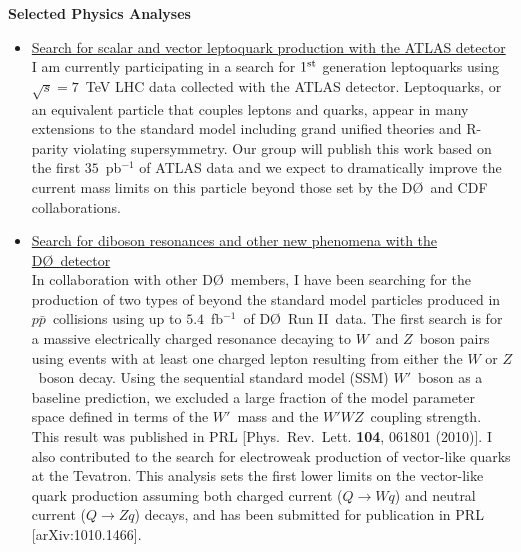 \documentclass[12pt]{article}
\newcommand{\dzero}{D\O}
\begin{document}
\noindent
\begin{singlespace}

\noindent
{\Large \textbf{Selected Physics Analyses}}

\begin{itemize}

\item{\underline{Search for scalar and vector leptoquark production with the ATLAS detector}\\
I am currently participating in a search for $1^{\rm{st}}$ generation leptoquarks using $\sqrt{s}=7$~TeV LHC data collected with the ATLAS detector. Leptoquarks, or an equivalent particle that couples leptons and quarks, appear in many extensions to the standard model including grand unified theories and R-parity violating supersymmetry. Our group will publish this work based on the first $35$~pb$^{-1}$ of ATLAS data and we expect to dramatically improve the current mass limits on this particle beyond those set by the \dzero~and CDF collaborations.}

\item{\underline{Search for diboson resonances and other new phenomena with the \dzero~detector}\\In collaboration with other \dzero~members, I have been searching for the production of two types of beyond the standard model particles produced in $p\bar{p}$~collisions using up to $5.4$~fb$^{-1}$~of \dzero~Run II~data. The first search is for a massive electrically charged resonance decaying to $W$~and $Z$~boson pairs using events with at least one charged lepton resulting from either the $W$ or $Z$~boson decay. Using the sequential standard model (SSM) $W'$~boson as a baseline prediction, we excluded a large fraction of the model parameter space defined in terms of the $W'$~mass and the $W'WZ$~coupling strength. This result was published in PRL [Phys.\ Rev.\  Lett. {\bf 104}, 061801 (2010)]. I also contributed to the search for electroweak production of vector-like quarks at the Tevatron. This analysis sets the first lower limits on the vector-like quark production assuming both charged current ($Q\rightarrow Wq$) and neutral current ($Q\rightarrow Zq$) decays, and has been submitted for publication in PRL [arXiv:1010.1466].}


\end{itemize}
\end{singlespace}
\end{document}
